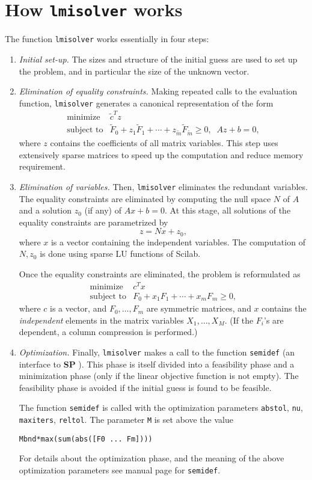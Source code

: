 \documentclass{article}
\begin{document}
\section{How {\tt lmisolver} works}
\label{s-lmisolver-works}
The function {\tt lmisolver} works essentially in four steps:
\begin{enumerate}
\item
{\em Initial set-up.}  The sizes and structure of the initial guess are
used to set up the problem, and in particular the size of the unknown
vector.
\item
{\em Elimination of equality constraints.}  Making repeated calls
to the evaluation function, {\tt lmisolver} generates 
a canonical representation of the form
\[
 \begin{array}{ll} \mbox{minimize} & \tilde{c}^T z\\ 
 \mbox{subject to} & \tilde{F}_0 + z_1\tilde{F}_1 + \cdots +
z_{\tilde{m}} \tilde{F}_{\tilde{m}} \geq 0, \;\; Az + b = 0,
 \end{array}
\]
where $z$ contains the coefficients of all matrix variables. 
This step uses extensively  sparse matrices to speed up
the computation and reduce memory requirement.
\item
{\em Elimination of variables.} Then, {\tt lmisolver} 
eliminates the redundant variables.  The equality
constraints are eliminated by computing the null space $N$ of $A$ and
a solution $z_0$ (if any) of $Ax+b=0$.  At this stage, all solutions
of the equality constraints are parametrized by 
\[
z = Nx+z_0,
\]
where $x$ is a vector containing the independent variables.  The
computation of $N,z_0$ is done using sparse LU functions of Scilab.

Once the equality constraints are eliminated, the problem is
reformulated as
\[
 \begin{array}{ll} \mbox{minimize} & c^T x\\
 \mbox{subject to} & F_0 + x_1F_1 + \cdots + x_m F_m \geq 0,
 \end{array}
\]
where $c$ is a vector, and $F_0,\ldots,F_m$ are symmetric matrices,
and $x$ contains the {\em independent\/} elements in the matrix
variables $X_1,\ldots,X_M$.  (If the $F_i$'s are dependent, a column
compression is performed.)
\item
{\em Optimization.}
Finally, {\tt lmisolver} makes a call to the function {\tt semidef}
(an interface to {\bf SP} \cite{sp}). This phase is itself divided into a
feasibility phase and a minimization phase (only if the linear
objective function is not empty).  The feasibility phase is avoided if
the initial guess is found to be feasible. 

The function {\tt semidef} is called with the optimization
parameters {\tt abstol}, {\tt nu}, {\tt maxiters}, {\tt reltol}.  The
parameter {\tt M} is set above the value
\begin{verbatim}
Mbnd*max(sum(abs([F0 ... Fm])))
\end{verbatim}
For details about the optimization phase, and the meaning of the above
optimization parameters see manual page for {\tt semidef}.
\end{enumerate}
\end{document}
